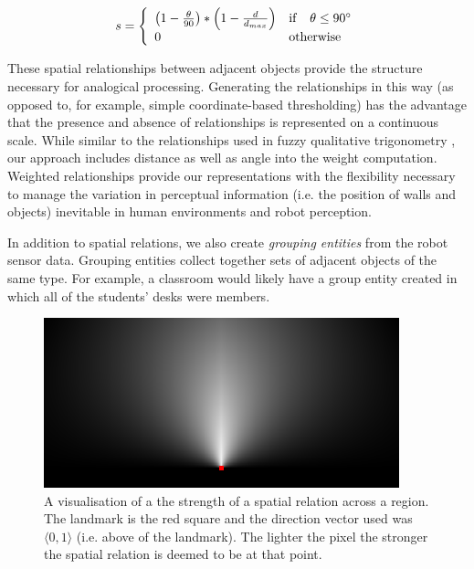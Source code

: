\begin{equation}
s = \left\{
\begin{array}{l l}
\left(1- \frac{\theta}{90}\right) * \left(1- \frac{d}{d_{max}}\right) & \mathrm{if} \quad \theta \leq 90^{\circ}\\
0 & \mathrm{otherwise}
\end{array} \right.
\label{eq:spatial}
\end{equation}


These spatial relationships between adjacent objects provide the structure necessary for analogical processing. Generating the relationships in this way (as opposed to, for example, simple coordinate-based thresholding) has the advantage that the presence and absence of relationships is represented on a continuous scale. While similar to the relationships used in fuzzy qualitative trigonometry \cite{Liu200971}, our approach includes distance as well as angle into the weight computation. Weighted relationships provide our representations with the flexibility necessary to manage the variation in perceptual information (i.e. the position of walls and objects) inevitable in human environments and robot perception.

In addition to spatial relations, we also create \emph{grouping entities}
from the robot sensor data. Grouping entities collect together sets of adjacent objects of the same type. For example, a classroom would likely have a group entity created in which all of the students' desks were members.

\begin{figure}
\centerline{
\includegraphics[width=\columnwidth]{./images/spatialRelations/xZeroYOne.png}
}
\caption{A visualisation of a the strength of a spatial relation across a region. The landmark is the red square and the direction vector used was $\langle0,1\rangle$ (i.e. above of the landmark). The lighter the pixel the stronger the spatial relation is deemed to be at that point.}
\label{fig:spr}
\end{figure}


